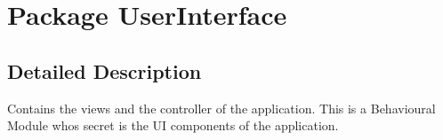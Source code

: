 \hypertarget{namespace_user_interface}{}\section{Package User\+Interface}
\label{namespace_user_interface}


\subsection{Detailed Description}
Contains the views and the controller of the application. This is a Behavioural Module who\textquotesingle{}s secret is the UI components of the application. 